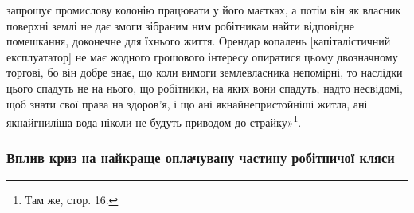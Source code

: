 \parcont{}  %
запрошує промислову колонію працювати у його маєтках, а
потім він як власник поверхні землі не дає змоги зібраним ним
робітникам найти відповідне помешкання, доконечне для їхнього
життя. Орендар копалень [капіталістичний експлуататор] не
має жодного грошового інтересу опиратися цьому двозначному
торгові, бо він добре знає, що коли вимоги землевласника непомірні,
то наслідки цього спадуть не на нього, що робітники, на
яких вони спадуть, надто несвідомі, щоб знати свої права на здоров’я,
і що ані якнайнепристойніші житла, ані якнайгниліша
вода ніколи не будуть приводом до страйку»\footnote{
Там же, стор. 16.
}.

\subsubsection{Вплив криз на найкраще оплачувану
частину робітничої кляси}

